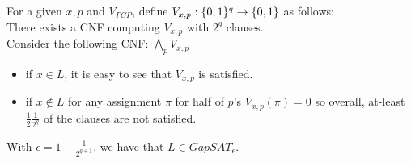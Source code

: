 For a given $x, p$ and $V_{PCP}$, define $V_{x,p}:\{0,1\}^q\rightarrow\{0,1\}$
as follows:\\
There exists a CNF computing $V_{x,p}$ with $2^q$ clauses.\\
Consider the following CNF:
$
	\bigwedge_{p}V_{x,p}
$
\begin{itemize}
	\item if $x\in L$, it is easy to see that $V_{x,p}$ is satisfied.
	\item 
	if $x\notin L$ for any assignment $\pi$ for half of $p$'s $V_{x,p}(\pi)=0$
	so overall, at-least $\frac{1}{2}\frac{1}{2^q}$ of the clauses 
	are not satisfied.
\end{itemize}
With $\epsilon=1-\frac{1}{2^{q+1}}$, we have that
$L\in GapSAT_\epsilon$.